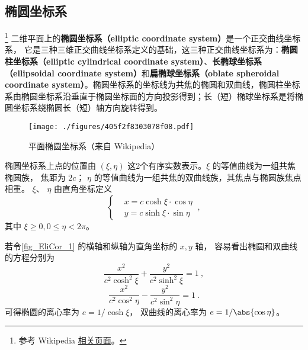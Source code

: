 
\begin{issues}
\end{issues}


\subsection{椭圆坐标系}
\footnote{参考 Wikipedia \href{https://en.wikipedia.org/wiki/Elliptic_coordinate_system}{相关页面}。}
二维平面上的\textbf{椭圆坐标系（elliptic coordinate system）}是一个正交曲线坐标系， 它是三种三维正交曲线坐标系定义的基础，这三种正交曲线坐标系为：\textbf{椭圆柱坐标系（elliptic cylindrical coordinate system）}、\textbf{长椭球坐标系（ellipsoidal coordinate system）}和\textbf{扁椭球坐标系（oblate spheroidal coordinate system）}。椭圆坐标系的坐标线为共焦的椭圆和双曲线，椭圆柱坐标系由椭圆坐标系沿垂直于椭圆坐标面的方向投影得到；长（短）椭球坐标系是将椭圆坐标系绕椭圆长（短）轴方向旋转得到。

\begin{figure}[ht]
\centering
\texttt{[image: ./figures/405f2f8303078f08.pdf]}
\caption{平面椭圆坐标系（来自 Wikipedia）} \label{fig_EliCor_1}
\end{figure}

椭圆坐标系上点的位置由 $(\xi,\eta)$ 这2个有序实数表示。$\xi$ 的等值曲线为一组共焦椭圆族， 焦距为 $2c$； $\eta$ 的等值曲线为一组共焦的双曲线族，其焦点与椭圆族焦点相重。 $\xi$、 $\eta$ 由直角坐标定义
\begin{equation}\label{eq_EliCor_3}
\left\{\begin{aligned}
&x=c\cosh\xi\cdot\cos\eta\\
&y=c\sinh\xi\cdot\sin\eta
\end{aligned}\right.~,
\end{equation}
其中 $\xi\geq0,0\leq\eta<2\pi$。

若令\autoref{fig_EliCor_1} 的横轴和纵轴为直角坐标的 $x, y$ 轴， 容易看出椭圆和双曲线的方程分别为
\begin{equation}\label{eq_EliCor_4}
\frac{x^2}{c^2\cosh^2\xi}+\frac{y^2}{c^2\sinh^2\xi}=1~,
\end{equation}
\begin{equation}\label{eq_EliCor_5}
\frac{x^2}{c^2\cos^2\eta}-\frac{y^2}{c^2\sin^2\eta}=1~.
\end{equation}
可得椭圆的离心率为 $e = 1/\cosh \xi$， 双曲线的离心率为 $e = 1/\abs{\cos \eta}$。

